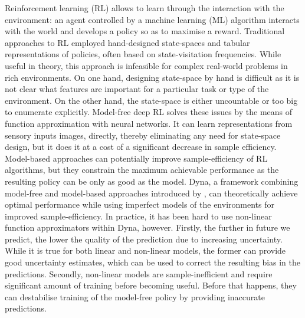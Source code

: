 %    


    Reinforcement learning (RL) allows to learn through the interaction with the environment: an agent controlled by a machine learning (ML) algorithm interacts with the world and develops a policy so as to maximise a reward. 
    Traditional approaches to RL employed hand-designed state-spaces and tabular representations of policies, often based on state-visitation frequencies.
    While useful in theory, this approach is infeasible for complex real-world problems in rich environments. 
    On one hand, designing state-space by hand is difficult as it is not clear what features are important for a particular task or type of the environment. 
    On the other hand, the state-space is either uncountable or too big to enumerate explicitly.
%    
    Model-free deep RL solves these issues by the means of function approximation with neural networks. 
    It can learn representations from sensory inputs \eg images, directly, thereby eliminating any need for state-space design, but it does it at a cost of a significant decrease in sample efficiency.
    Model-based approaches can potentially improve sample-efficiency of RL algorithms, but they constrain the maximum achievable performance as the resulting policy can be only as good as the model.
    Dyna, a framework combining model-free and model-based approaches introduced by \cite{Sutton1991}, can theoretically achieve optimal performance while using imperfect models of the environments for improved sample-efficiency.
    In practice, it has been hard to use non-linear function approximators within Dyna, however.
    Firstly, the further in future we predict, the lower the quality of the prediction due to increasing uncertainty. 
    While it is true for both linear and non-linear models, the former can provide good uncertainty estimates, which can be used to correct the resulting bias in the predictions. 
    Secondly, non-linear models are sample-inefficient and require significant amount of training before becoming useful. 
    Before that happens, they can destabilise training of the model-free policy by providing inaccurate predictions.

